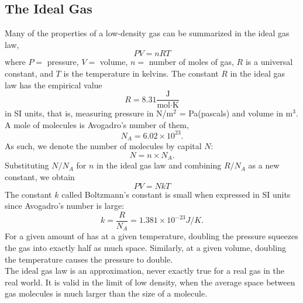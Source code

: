 \documentclass[11pt]{exam}
\begin{document}
\subsection{The Ideal Gas}
Many of the properties of a low-density gas can be summarized in the ideal gas law, 
\begin{equation}\tag{1.1}
PV=nRT
\end{equation}
where $P=$ pressure, $V=$ volume, $n=$ number of moles of gas, $R$ is a universal constant, and $T$ is the temperature in kelvins. The constant $R$ in the ideal gas law has the empirical value 
\begin{equation}\tag{1.2}
R=8.31\frac{\text{J}}{\text{mol}\cdot\text{K}}
\end{equation}
in SI units, that is, measuring pressure in N/m$^2$ = Pa\;(pascals) and volume in m$^3$. A mole of molecules is Avogadro's number of them, 
\begin{equation}\tag{1.3}
N_A = 6.02\times 10^{23}.
\end{equation}
As such, we denote the number of molecules by capital $N$:
\begin{equation}\tag{1.4}
N=n\times N_A.   
\end{equation}
Substituting $N/N_A$ for $n$ in the ideal gas law and combining $R/N_A$ as a new constant, we obtain 
\begin{equation}\tag{1.5}
PV=NkT
\end{equation}
The constant $k$ called Boltzmann's constant is small when expressed in SI units since Avogadro's number is large:
\begin{equation}\tag{1.6}
k=\frac{R}{N_A}=1.381\times 10^{-23} J/K.
\end{equation}
\hspace*{10mm}For a given amount of has at a given temperature, doubling the pressure squeezes the gas into exactly half as much space. Similarly, at a given volume, doubling the temperature causes the pressure to double.\\
\hspace*{10mm}The ideal gas law is an approximation, never exactly true for a real gas in the real world. It is valid in the limit of low density, when the average space between gas molecules is much larger than the size of a molecule. 
\newpage
\end{document}
